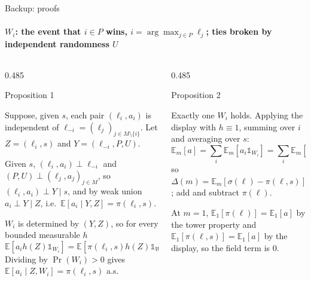 \documentclass[aspectratio=169,10pt,t]{beamer}
\newcommand{\paneltitle}[1]{{\color{accentdark}\small\firasemibold #1}\par\vspace{0.8mm}}
\begin{document}
\begin{frame}{Backup: proofs}
  \framesubtitle{$W_i$: the event that $i \in P$ wins, $i = \arg\max_{j\in P}\ell_j$; ties broken by independent randomness $U$}
  \vspace{1.5mm}
  \footnotesize
  \begin{columns}[T,onlytextwidth]
    \begin{column}{0.485\textwidth}\raggedright
      \paneltitle{Proposition 1}
      Suppose, given $s$, each pair $(\ell_i, a_i)$ is independent of
      $\ell_{-i} = (\ell_j)_{j \in M\setminus\{i\}}$. Let $Z = (\ell_i, s)$ and
      $Y = (\ell_{-i}, P, U)$.\par\vspace{1mm}
      Given $s$, $(\ell_i, a_i) \perp \ell_{-i}$ and $(P, U) \perp (\ell_j, a_j)_{j\in M}$, so
      $(\ell_i, a_i) \perp Y \mid s$, and by weak union $a_i \perp Y \mid Z$, i.e.\
      $\mathbb{E}[a_i \mid Y, Z] = \pi(\ell_i, s)$.\par\vspace{1mm}
      $W_i$ is determined by $(Y, Z)$, so for every bounded measurable $h$
      \[
        \mathbb{E}[a_i h(Z) \mathbb{1}_{W_i}] = \mathbb{E}[\pi(\ell_i, s) h(Z) \mathbb{1}_{W_i}].
      \]
      Dividing by $\Pr(W_i) > 0$ gives $\mathbb{E}[a_i \mid Z, W_i] = \pi(\ell_i, s)$ a.s.
    \end{column}
    \begin{column}{0.485\textwidth}\raggedright
      \paneltitle{Proposition 2}
      Exactly one $W_i$ holds. Applying the display with $h \equiv 1$, summing over $i$ and
      averaging over $s$:
      \[
        \mathbb{E}_m[a] = \textstyle\sum_i \mathbb{E}_m[a_i \mathbb{1}_{W_i}]
        = \textstyle\sum_i \mathbb{E}_m[\pi(\ell_i, s)\mathbb{1}_{W_i}]
        = \mathbb{E}_m[\pi(\ell, s)],
      \]
      so $\Delta(m) = \mathbb{E}_m[\sigma(\ell) - \pi(\ell, s)]$; add and subtract
      $\pi(\ell)$.\par\vspace{1mm}
      At $m = 1$, $\mathbb{E}_1[\pi(\ell)] = \mathbb{E}_1[a]$ by the tower property and
      $\mathbb{E}_1[\pi(\ell, s)] = \mathbb{E}_1[a]$ by the display, so the field term is 0.
    \end{column}
  \end{columns}
\end{frame}
\end{document}
